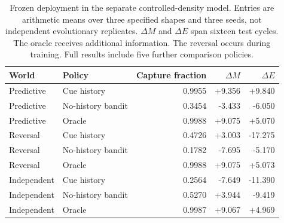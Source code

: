 \begin{table}[htbp]\centering\small
\caption{Frozen deployment in the separate controlled-density model. Entries are arithmetic means over three specified shapes and three seeds, not independent evolutionary replicates. $\Delta M$ and $\Delta E$ span sixteen test cycles. The oracle receives additional information. The reversal occurs during training. Full results include five further comparison policies.}
\label{tab:ecology}
\begin{tabular}{llrrr}\toprule
World & Policy & Capture fraction & $\Delta M$ & $\Delta E$\\\midrule
Predictive & Cue history & 0.9955 & +9.356 & +9.840\\
Predictive & No-history bandit & 0.3454 & -3.433 & -6.050\\
Predictive & Oracle & 0.9988 & +9.075 & +5.070\\
\addlinespace
Reversal & Cue history & 0.4726 & +3.003 & -17.275\\
Reversal & No-history bandit & 0.1782 & -7.695 & -5.170\\
Reversal & Oracle & 0.9988 & +9.075 & +5.073\\
\addlinespace
Independent & Cue history & 0.2564 & -7.649 & -11.390\\
Independent & No-history bandit & 0.5270 & +3.944 & -9.419\\
Independent & Oracle & 0.9987 & +9.067 & +4.969\\
\bottomrule\end{tabular}
\end{table}
